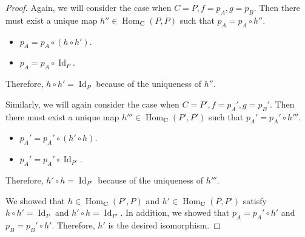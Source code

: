 \documentclass[12pt, psamsfonts]{amsart}
\theoremstyle{definition}
\theoremstyle{remark}
\DeclareMathOperator{\Hom}{Hom}
\DeclareMathOperator{\Id}{Id}
\numberwithin{equation}{section}
\begin{document}
\begin{proof}
  Again, we will consider the case when $C = P, f = p_A, g = p_B$.
  Then there must exist a unique map $h'' \in \Hom_{\mathbf{C}}(P, P)$ such that $p_A = p_A \circ h''$.

  \begin{itemize}
    \item
      $p_A = p_A \circ (h \circ h')$.
    \item
      $p_A = p_A \circ \Id_P$.
  \end{itemize}

  Therefore, $h \circ h' = \Id_P$ because of the uniqueness of $h''$.

  Similarly, we will again consider the case when $C = P', f = p_A', g = p_B'$.
  Then there must exist a unique map $h''' \in \Hom_{\mathbf{C}}(P', P')$ such that $p_A' = p_A' \circ h'''$.

  \begin{itemize}
    \item
      $p_A' = p_A' \circ (h' \circ h)$.
    \item
      $p_A' = p_A' \circ \Id_{P'}$.
  \end{itemize}

  Therefore, $h' \circ h = \Id_{P'}$ because of the uniqueness of $h'''$.

  We showed that $h \in \Hom_{\mathbf{C}}(P', P)$ and $h' \in \Hom_{\mathbf{C}}(P, P')$ satisfy $h \circ h' = \Id_P$ and $h' \circ h = \Id_{P'}$.
  In addition, we showed that $p_A = p_A' \circ h'$ and $p_B = p_B' \circ h'$.
  Therefore, $h'$ is the desired isomorphism.
\end{proof}
\end{document}
